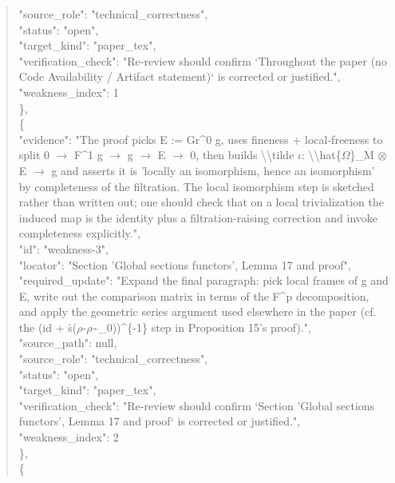 \documentclass[11pt]{article}
\begin{document}
\begin{quote}
      "source\_role": "technical\_correctness",\\
      "status": "open",\\
      "target\_kind": "paper\_tex",\\
      "verification\_check": "Re-review should confirm `Throughout the paper (no Code Availability / Artifact statement)` is corrected or justified.",\\
      "weakness\_index": 1\\
    \},\\
    \{\\
      "evidence": "The proof picks E := Gr\^{}0 g, uses fineness + local-freeness to split 0 \ensuremath{\to} F\^{}1 g \ensuremath{\to} g \ensuremath{\to} E \ensuremath{\to} 0, then builds \textbackslash{}\textbackslash{}tilde \ensuremath{\iota}: \textbackslash{}\textbackslash{}hat\{\ensuremath{\Omega}\}\_M \ensuremath{\otimes} E \ensuremath{\to} g and asserts it is 'locally an isomorphism, hence an isomorphism' by completeness of the filtration. The local isomorphism step is sketched rather than written out; one should check that on a local trivialization the induced map is the identity plus a filtration-raising correction and invoke completeness explicitly.",\\
      "id": "weakness-3",\\
      "locator": "Section 'Global sections functors', Lemma 17 and proof",\\
      "required\_update": "Expand the final paragraph: pick local frames of g and E, write out the comparison matrix in terms of the F\^{}p decomposition, and apply the geometric series argument used elsewhere in the paper (cf. the (id + ṡ(\ensuremath{\rho}-\ensuremath{\rho}\~{}\_0))\^{}\{-1\} step in Proposition 15's proof).",\\
      "source\_path": null,\\
      "source\_role": "technical\_correctness",\\
      "status": "open",\\
      "target\_kind": "paper\_tex",\\
      "verification\_check": "Re-review should confirm `Section 'Global sections functors', Lemma 17 and proof` is corrected or justified.",\\
      "weakness\_index": 2\\
    \},\\
    \{\\

\end{quote}
\end{document}
